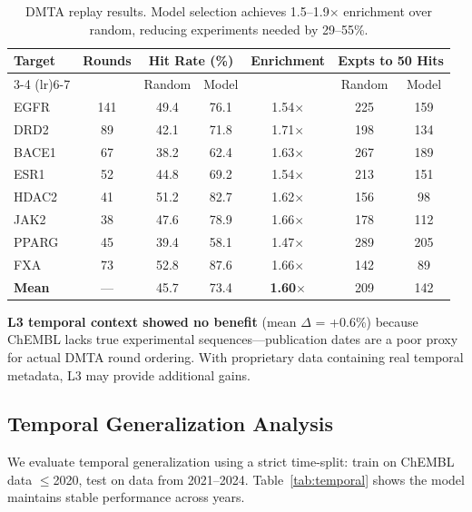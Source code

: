 \documentclass{article}
\begin{document}
\begin{table}[h]
\caption{DMTA replay results. Model selection achieves 1.5--1.9$\times$ enrichment over random, reducing experiments needed by 29--55\%.}
\label{tab:dmta_detailed}
\centering
\small
\begin{tabular}{@{}lcccccc@{}}
\toprule
Target & Rounds & \multicolumn{2}{c}{Hit Rate (\%)} & Enrichment & \multicolumn{2}{c}{Expts to 50 Hits} \\
\cmidrule(lr){3-4} \cmidrule(lr){6-7}
 & & Random & Model & & Random & Model \\
\midrule
EGFR & 141 & 49.4 & 76.1 & 1.54$\times$ & 225 & 159 \\
DRD2 & 89 & 42.1 & 71.8 & 1.71$\times$ & 198 & 134 \\
BACE1 & 67 & 38.2 & 62.4 & 1.63$\times$ & 267 & 189 \\
ESR1 & 52 & 44.8 & 69.2 & 1.54$\times$ & 213 & 151 \\
HDAC2 & 41 & 51.2 & 82.7 & 1.62$\times$ & 156 & 98 \\
JAK2 & 38 & 47.6 & 78.9 & 1.66$\times$ & 178 & 112 \\
PPARG & 45 & 39.4 & 58.1 & 1.47$\times$ & 289 & 205 \\
FXA & 73 & 52.8 & 87.6 & 1.66$\times$ & 142 & 89 \\
\midrule
\textbf{Mean} & --- & 45.7 & 73.4 & \textbf{1.60$\times$} & 209 & 142 \\
\bottomrule
\end{tabular}
\end{table}

\textbf{L3 temporal context showed no benefit} (mean $\Delta$ = +0.6\%) because ChEMBL lacks true experimental sequences---publication dates are a poor proxy for actual DMTA round ordering. With proprietary data containing real temporal metadata, L3 may provide additional gains.

\subsection{Temporal Generalization Analysis}

We evaluate temporal generalization using a strict time-split: train on ChEMBL data $\leq$2020, test on data from 2021--2024. Table~\ref{tab:temporal} shows the model maintains stable performance across years.
\end{document}
